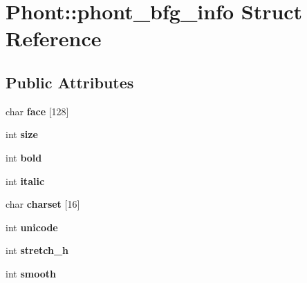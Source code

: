 \hypertarget{struct_phont_1_1phont__bfg__info}{\section{Phont\-:\-:phont\-\_\-bfg\-\_\-info Struct Reference}
\label{struct_phont_1_1phont__bfg__info}
}
\subsection*{Public Attributes}
\begin{DoxyCompactItemize}
\item 
\hypertarget{struct_phont_1_1phont__bfg__info_a867976255cf63762ae706963fe13be44}{char {\bfseries face} \mbox{[}128\mbox{]}}\label{struct_phont_1_1phont__bfg__info_a867976255cf63762ae706963fe13be44}

\item 
\hypertarget{struct_phont_1_1phont__bfg__info_a74370c9b79eca7c0c7fdc4b04a56ea09}{int {\bfseries size}}\label{struct_phont_1_1phont__bfg__info_a74370c9b79eca7c0c7fdc4b04a56ea09}

\item 
\hypertarget{struct_phont_1_1phont__bfg__info_a4284c61b5fc516716b99610a2b97fe65}{int {\bfseries bold}}\label{struct_phont_1_1phont__bfg__info_a4284c61b5fc516716b99610a2b97fe65}

\item 
\hypertarget{struct_phont_1_1phont__bfg__info_ae533bb2e032eeff0c1f306ff86ccf89c}{int {\bfseries italic}}\label{struct_phont_1_1phont__bfg__info_ae533bb2e032eeff0c1f306ff86ccf89c}

\item 
\hypertarget{struct_phont_1_1phont__bfg__info_a36911e044f1a75a240cda18c14fd168b}{char {\bfseries charset} \mbox{[}16\mbox{]}}\label{struct_phont_1_1phont__bfg__info_a36911e044f1a75a240cda18c14fd168b}

\item 
\hypertarget{struct_phont_1_1phont__bfg__info_a325fcbd6ce4ab17b7f087f1978f6e2e3}{int {\bfseries unicode}}\label{struct_phont_1_1phont__bfg__info_a325fcbd6ce4ab17b7f087f1978f6e2e3}

\item 
\hypertarget{struct_phont_1_1phont__bfg__info_a2fd5705c3257bd2858cce8e765fb6f36}{int {\bfseries stretch\-\_\-h}}\label{struct_phont_1_1phont__bfg__info_a2fd5705c3257bd2858cce8e765fb6f36}

\item 
\hypertarget{struct_phont_1_1phont__bfg__info_aa2a7610fa1136dcae5f1fc623e6ffc93}{int {\bfseries smooth}}\label{struct_phont_1_1phont__bfg__info_aa2a7610fa1136dcae5f1fc623e6ffc93}


\end{DoxyCompactItemize}
